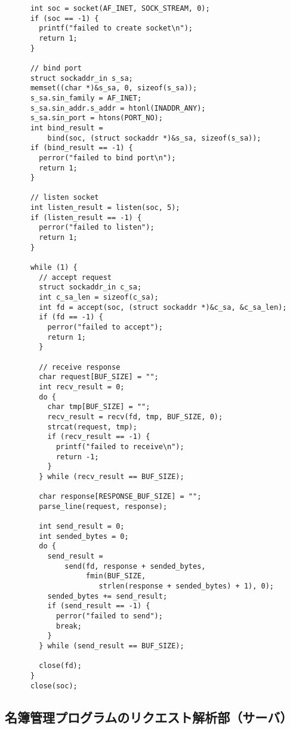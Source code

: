 \documentclass[11pt]{jsarticle}
\begin{document}
\begin{verbatim}
      int soc = socket(AF_INET, SOCK_STREAM, 0);
      if (soc == -1) {
        printf("failed to create socket\n");
        return 1;
      }
    
      // bind port
      struct sockaddr_in s_sa;
      memset((char *)&s_sa, 0, sizeof(s_sa));
      s_sa.sin_family = AF_INET;
      s_sa.sin_addr.s_addr = htonl(INADDR_ANY);
      s_sa.sin_port = htons(PORT_NO);
      int bind_result = 
          bind(soc, (struct sockaddr *)&s_sa, sizeof(s_sa));
      if (bind_result == -1) {
        perror("failed to bind port\n");
        return 1;
      }
    
      // listen socket
      int listen_result = listen(soc, 5);
      if (listen_result == -1) {
        perror("failed to listen");
        return 1;
      }
    
      while (1) {
        // accept request
        struct sockaddr_in c_sa;
        int c_sa_len = sizeof(c_sa);
        int fd = accept(soc, (struct sockaddr *)&c_sa, &c_sa_len);
        if (fd == -1) {
          perror("failed to accept");
          return 1;
        }
    
        // receive response
        char request[BUF_SIZE] = "";
        int recv_result = 0;
        do {
          char tmp[BUF_SIZE] = "";
          recv_result = recv(fd, tmp, BUF_SIZE, 0);
          strcat(request, tmp);
          if (recv_result == -1) {
            printf("failed to receive\n");
            return -1;
          }
        } while (recv_result == BUF_SIZE);
    
        char response[RESPONSE_BUF_SIZE] = "";
        parse_line(request, response);
    
        int send_result = 0;
        int sended_bytes = 0;
        do {
          send_result =
              send(fd, response + sended_bytes,
                   fmin(BUF_SIZE, 
                      strlen(response + sended_bytes) + 1), 0);
          sended_bytes += send_result;
          if (send_result == -1) {
            perror("failed to send");
            break;
          }
        } while (send_result == BUF_SIZE);
    
        close(fd);
      }
      close(soc);
\end{verbatim}

\subsection{名簿管理プログラムのリクエスト解析部（サーバ）} \label{sec:parse_request.c}
\end{document}
